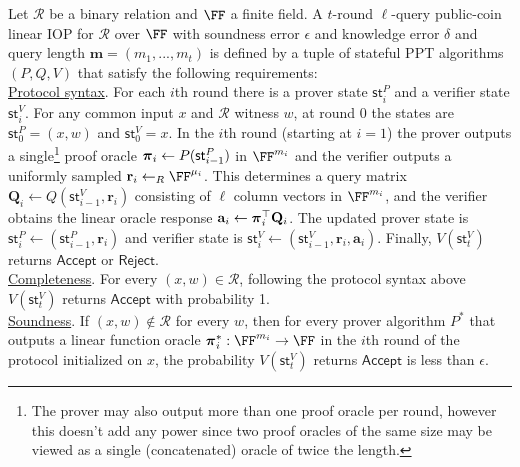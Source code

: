 \begin{definition} 
\label{def:linearIOP}
Let $\mathcal{R}$ be a binary relation and $\FF$ a finite field. A $t$-round $\ell$-query public-coin linear IOP for $\mathcal{R}$ over $\FF$ with soundness error $\epsilon$ and knowledge error $\delta$ and query length $\mathbf{m} = (m_1,...,m_t)$ is defined by a tuple of stateful PPT algorithms $(P, Q, V)$ that satisfy the following requirements:\\
 
\noindent \underline{Protocol syntax}. 
For each $i$th round there is a prover state $\textsf{st}^P_i$ and a verifier state $\textsf{st}^V_i$. For any common input $x$ and $\mathcal{R}$ witness $w$, at round 0 the states are $\textsf{st}^P_0 = (x, w)$ and $\textsf{st}^V_0 = x$. 
In the $i$th round (starting at $i = 1$) the prover outputs a single\footnote{The prover may also output more than one proof oracle per round, however this doesn't add any power since two proof oracles of the same size may be viewed as a single (concatenated) oracle of twice the length.} proof oracle $\boldsymbol{\pi}_i \leftarrow P(\textsf{st}^P_{i-1})$ in $\FF^{m_i}$ and the verifier outputs a uniformly sampled $\mathbf{r}_i \leftarrow_R \FF^{\mu_i}$. 
This determines a query matrix $\mathbf{Q}_i \leftarrow Q(\textsf{st}^V_{i-1}, \mathbf{r}_i)$ consisting of $\ell$ column vectors in $\FF^{m_i}$, and the verifier obtains the linear oracle response $\mathbf{a}_i \leftarrow \boldsymbol{\pi}_i^\top \mathbf{Q}_i$. The updated prover state is $\textsf{st}^P_i \leftarrow (\textsf{st}^P_{i-1}, \mathbf{r}_i)$ and verifier state is $\textsf{st}^V_i \leftarrow (\textsf{st}^V_{i-1}, \mathbf{r}_i, \mathbf{a}_i)$. Finally, $V(\textsf{st}^V_t)$ returns $\textsf{Accept}$ or $\textsf{Reject}$. \\ 

\noindent \underline{Completeness}. For every $(x, w) \in \mathcal{R}$, following the protocol syntax above $V(\textsf{st}^V_t)$ returns $\textsf{Accept}$ with probability 1. \\

\noindent \underline{Soundness}. If $(x, w) \notin \mathcal{R}$ for every $w$, then for every prover algorithm $P^*$ that outputs a linear function oracle $\proofO^*_i: \FF^{m_i} \rightarrow \FF$ in the $i$th round of the protocol initialized on $x$, the probability $V(\textsf{st}^V_t)$ returns $\textsf{Accept}$ is less than $\epsilon$. \\


\end{definition}
